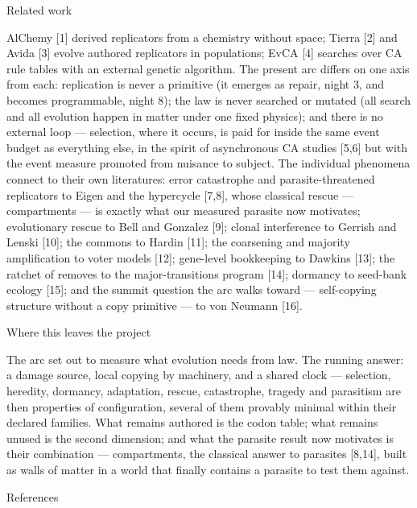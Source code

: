 \sec Related work

AlChemy [1] derived replicators from a chemistry without space;
Tierra [2] and Avida [3] evolve authored replicators in populations;
EvCA [4] searches over CA rule tables with an external genetic
algorithm. The present arc differs on one axis from each:
replication is never a primitive (it emerges as repair, night 3, and
becomes programmable, night 8); the law is never searched or
mutated (all search and all evolution happen in matter under one
fixed physics); and there is no external loop --- selection,
where it occurs, is paid for inside the same event budget as
everything else, in the spirit of asynchronous CA studies [5,6] but
with the event measure promoted from nuisance to subject. The
individual phenomena connect to their own literatures: error
catastrophe and parasite-threatened replicators to Eigen and the
hypercycle [7,8], whose classical rescue --- compartments --- is
exactly what our measured parasite now motivates; evolutionary
rescue to Bell and Gonzalez [9]; clonal interference to Gerrish and
Lenski [10]; the commons to Hardin [11]; the coarsening and
majority amplification to voter models [12]; gene-level bookkeeping
to Dawkins [13]; the ratchet of removes to the major-transitions
program [14]; dormancy to seed-bank ecology [15]; and the summit
question the arc walks toward --- self-copying structure without a
copy primitive --- to von Neumann [16].

\sec Where this leaves the project

The arc set out to measure what evolution needs from law. The
running answer: a damage source, local copying by machinery, and a
shared clock --- selection, heredity, dormancy, adaptation, rescue,
catastrophe, tragedy and parasitism are then properties of
configuration, several of them provably minimal within their
declared families. What remains authored is the codon table; what
remains unused is the second dimension; and what the parasite
result now motivates is their combination --- compartments, the
classical answer to parasites [8,14], built as walls of matter in a
world that finally contains a parasite to test them against.

\sec References

